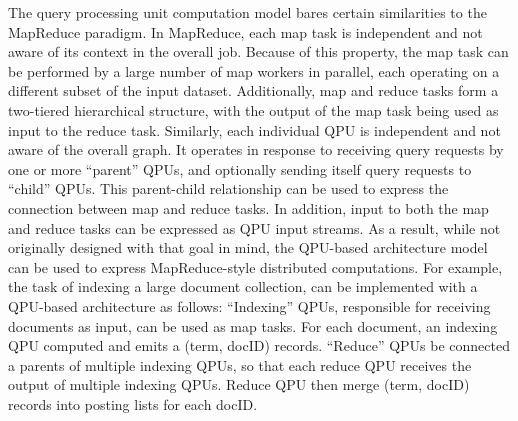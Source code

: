 The query processing unit computation model bares certain similarities to the MapReduce paradigm.
In MapReduce, each map task is independent and not aware of its context in the overall job.
Because of this property, the map task can be performed by a large number of map workers in parallel,
each operating on a different subset of the input dataset.
Additionally, map and reduce tasks form a two-tiered hierarchical structure,
with the output of the map task being used as input to the reduce task.
Similarly, each individual QPU is independent and not aware of the overall graph.
It operates in response to receiving query requests by one or more ``parent'' QPUs,
and optionally sending itself query requests to ``child'' QPUs.
This parent-child relationship can be used to express the connection between map and reduce tasks.
In addition, input to both the map and reduce tasks can be expressed as QPU input streams.
As a result, while not originally designed with that goal in mind,
the QPU-based architecture model can be used to express MapReduce-style distributed computations.
For example, the task of indexing a large document collection, can be implemented with a QPU-based architecture
as follows:
``Indexing'' QPUs, responsible for receiving documents as input, can be used as map tasks.
For each document, an indexing QPU computed and emits a (term, docID) records.
``Reduce'' QPUs be connected a parents of multiple indexing QPUs,
so that each reduce QPU receives the output of multiple indexing QPUs.
Reduce QPU then merge (term, docID) records into posting lists for each docID.